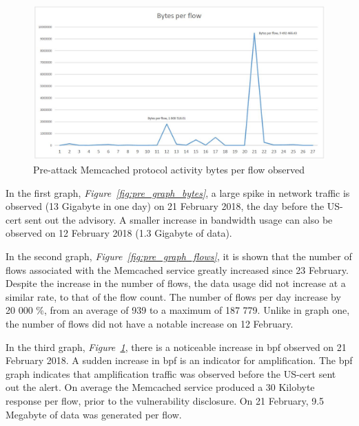 \begin{figure}
    \centering
    \includegraphics[width=\columnwidth]{section_4/memcached_pre-attack_bpf.JPG}
    \caption{Pre-attack Memcached protocol activity bytes per flow observed }
    \label{fig:pre_graph_bpf}
\end{figure}
In the first graph, \textit{Figure~\ref{fig:pre_graph_bytes}}, a large spike in network traffic is observed (13 Gigabyte in one day) on 21 February 2018, the day before the US-\gls{cert} sent out the advisory. A smaller increase in bandwidth usage can also be observed on 12 February 2018 (1.3 Gigabyte of data). 



In the second graph, \textit{Figure~\ref{fig:pre_graph_flows}}, it is shown that the number of flows associated with the Memcached service greatly increased since 23 February. Despite the increase in the number of flows, the data usage did not increase at a similar rate, to that of the flow count. The number of flows per day increase by 20 000 \%, from an average of 939 to a maximum of 187 779. Unlike in graph one, the number of flows did not have a notable increase on 12 February. 



In the third graph, \textit{Figure~\ref{fig:pre_graph_bpf}}, there is a noticeable increase in \gls{bpf} observed on 21 February 2018. A sudden increase in \gls{bpf} is an indicator for amplification. The \gls{bpf} graph indicates that amplification traffic was observed before the US-\gls{cert} sent out the alert. On average the Memcached service produced a 30 Kilobyte response per flow, prior to the vulnerability disclosure. On 21 February, 9.5 Megabyte of data was generated per flow.  

